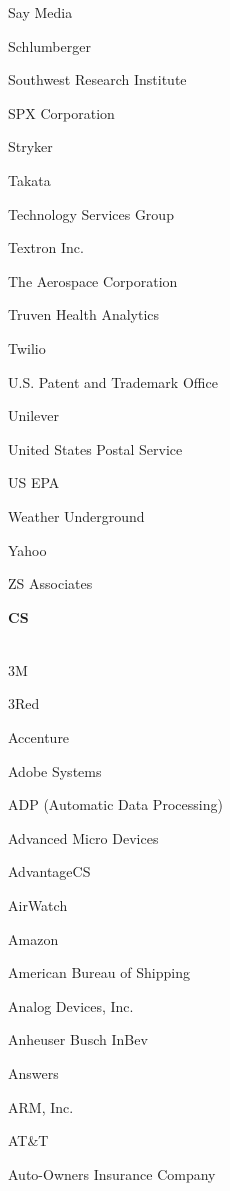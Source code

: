 \documentclass[twoside]{article}
\begin{document}
\begin{center}
\begin{multicols}{5}
\begin{FlushLeft}
\begin{compactitem}
\item Say Media
\item Schlumberger
\item Southwest Research Institute
\item SPX Corporation
\item Stryker
\item Takata
\item Technology Services Group
\item Textron Inc.
\item The Aerospace Corporation
\item Truven Health Analytics
\item Twilio
\item U.S. Patent and Trademark Office
\item Unilever
\item United States Postal Service
\item US EPA
\item Weather Underground
\item Yahoo
\item ZS Associates
\end{compactitem}
        \end{FlushLeft}
        \vspace{1em}
        {\fontsize{14}{16}\selectfont \bf CS}\\
        \vspace{-1em}
        ~\hrulefill~
        \vspace{-.9em}
        \begin{FlushLeft}
        \begin{compactitem}
        \item 3M
\item 3Red
\item Accenture
\item Adobe Systems
\item ADP (Automatic Data Processing)
\item Advanced Micro Devices
\item AdvantageCS
\item AirWatch
\item Amazon
\item American Bureau of Shipping
\item Analog Devices, Inc.
\item Anheuser Busch InBev
\item Answers
\item ARM, Inc.
\item AT\&T
\item Auto-Owners Insurance Company

\end{compactitem}
\end{FlushLeft}
\end{multicols}
\end{center}
\end{document}
